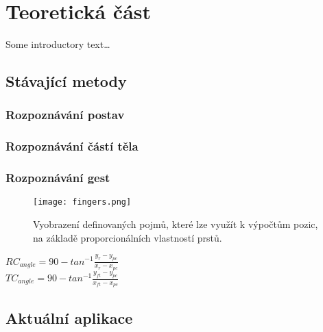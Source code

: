\chapter{Teoretická část}
Some introductory text\dots







\section{Stávající metody}



\subsection{Rozpoznávání postav}
\subsection{Rozpoznávání částí těla}
\subsection{Rozpoznávání gest}
\begin{figure}[h]
\centering
\texttt{[image: fingers.png]}
\caption{Vyobrazení definovaných pojmů, které lze využít k výpočtům pozic, na základě proporcionálních vlastností prstů. ~\cite{13} }
\end{figure}
\begin{center}
$RC_{angle} = 90 - tan^{-1} \frac{y_{r}-y_{pc}}{x_{r} - x_{pc}}$ \\
$TC_{angle} = 90 - tan^{-1} \frac{y_{ft}-y_{pc}}{x_{ft} - x_{pc}}$ 
\end{center}
\section{Aktuální aplikace} %



\endinput

